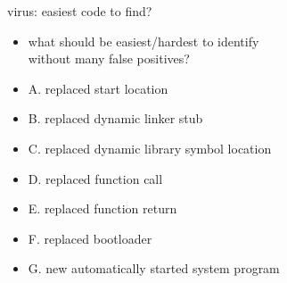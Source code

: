 \begin{frame}{virus: easiest code to find?}
    \begin{itemize}
    \item what should be easiest/hardest to identify \\
        without many false positives?
    \vspace{.5cm}
        \item A. replaced start location
        \item B. replaced dynamic linker stub
        \item C. replaced dynamic library symbol location
        \item D. replaced function call
        \item E. replaced function return
        \item F. replaced bootloader
        \item G. new automatically started system program
    \end{itemize}
\end{frame}


